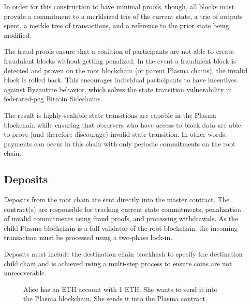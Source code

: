 \documentclass[letterpaper, 11pt]{article}
\begin{document}
In order for this construction to have minimal proofs, though, all blocks must
provide a commitment to a merkleized trie of the current state, a trie of
outputs spent, a merkle tree of transactions, and a reference to the prior state
being modified.

The fraud proofs ensure that a coalition of participants are not able to create
fraudulent blocks without getting penalized. In the event a fraudulent block is
detected and proven on the root blockchain (or parent Plasma chains), the
invalid block is rolled back. This encourages individual participants to have
incentives against Byzantine behavior, which solves the state transition
vulnerability in federated-peg Bitcoin Sidechains.

The result is highly-scalable state transitions are capable in the Plasma
blockchain while ensuring that observers who have access to block data are able
to prove (and therefore discourage) invalid state transition. In other words,
payments can occur in this chain with only periodic commitments on the root
chain.

\subsection{Deposits}

Deposits from the root chain are sent directly into the master contract. The
contract(s) are responsible for tracking current state commitments, penalization
of invalid commitments using fraud proofs, and processing withdrawals. As
the child Plasma blockchain is a full validator of the root blockchain, the
incoming transaction must be processed using a two-phase lock-in.

Deposits must include the destination chain blockhash to specify the destination
child chain and is achieved using a multi-step process to ensure coins are not
unrecoverable.

\begin{figure}[H]
	\caption{
		Alice has an ETH account with 1 ETH. She wants to send it into
		the Plasma blockchain. She sends it into the Plasma contract.
		}
\end{figure}
\end{document}

